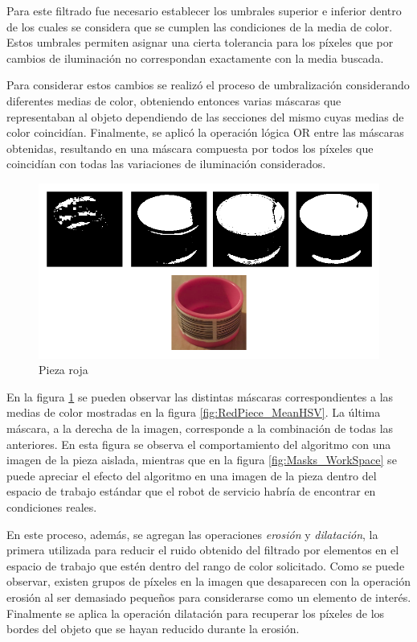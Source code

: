 Para este filtrado fue necesario establecer los umbrales superior e inferior dentro de los cuales se considera que se cumplen las condiciones de la media de color. Estos umbrales permiten asignar una cierta tolerancia para los píxeles que por cambios de iluminación no correspondan exactamente con la media buscada.

Para considerar estos cambios se realizó el proceso de umbralización considerando diferentes medias de color, obteniendo entonces varias máscaras que representaban al objeto dependiendo de las secciones del mismo cuyas medias de color coincidían. Finalmente, se aplicó la operación lógica OR entre las máscaras obtenidas, resultando en una máscara compuesta por todos los píxeles que coincidían con todas las variaciones de iluminación considerados.

\begin{figure}[ht]
\centering
\includegraphics[scale= 0.35]{Figures/Masks_Piece.png}
    \caption{Pieza roja}
    \label{fig:Masks_RedPiece}
\end{figure}

En la figura \ref{fig:Masks_RedPiece} se pueden observar las distintas máscaras correspondientes a las medias de color mostradas en la figura \ref{fig:RedPiece_MeanHSV}. La última máscara, a la derecha de la imagen, corresponde a la combinación de todas las anteriores. En esta figura se observa el comportamiento del algoritmo con una imagen de la pieza aislada, mientras que en la figura \ref{fig:Masks_WorkSpace} se puede apreciar el efecto del algoritmo en una imagen de la pieza dentro del espacio de trabajo estándar que el robot de servicio habría de encontrar en condiciones reales. 

En este proceso, además, se agregan las operaciones \textit{erosión} y \textit{dilatación}, la primera utilizada para reducir el ruido obtenido del filtrado por elementos en el espacio de trabajo que estén dentro del rango de color solicitado. Como se puede observar, existen grupos de píxeles en la imagen que desaparecen con la operación erosión al ser demasiado pequeños para considerarse como un elemento de interés. Finalmente se aplica la operación dilatación para recuperar los píxeles  de los bordes del objeto que se hayan reducido durante la erosión. 

